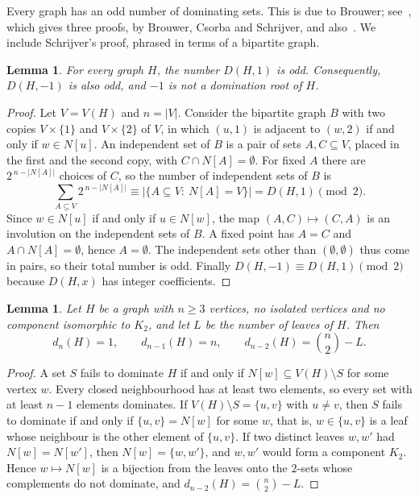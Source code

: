 \documentclass{amsart}
\newtheorem{lemma}[theorem]{Lemma}
\theoremstyle{definition}
\theoremstyle{remark}
\numberwithin{equation}{section}
\begin{document}
Every graph has an odd number of dominating sets. This is due to Brouwer; see~\cite{Bro09}, which gives three proofs, by Brouwer, Csorba and Schrijver, and also~\cite[Theorem~5]{Obo16}. We include Schrijver's proof, phrased in terms of a bipartite graph.

\begin{lemma}\label{lem:parity}
For every graph $H$, the number $D(H,1)$ is odd. Consequently, $D(H,-1)$ is also odd, and $-1$ is not a domination root of $H$.
\end{lemma}

\begin{proof}
Let $V=V(H)$ and $n=|V|$. Consider the bipartite graph $B$ with two copies $V\times\{1\}$ and $V\times\{2\}$ of $V$, in which $(u,1)$ is adjacent to $(w,2)$ if and only if $w\in N[u]$. An independent set of $B$ is a pair of sets $A,C\subseteq V$, placed in the first and the second copy, with $C\cap N[A]=\emptyset$. For fixed $A$ there are $2^{\,n-|N[A]|}$ choices of $C$, so the number of independent sets of $B$ is
\[
\sum_{A\subseteq V}2^{\,n-|N[A]|}\equiv\bigl|\{A\subseteq V:\ N[A]=V\}\bigr|=D(H,1)\pmod 2.
\]
Since $w\in N[u]$ if and only if $u\in N[w]$, the map $(A,C)\mapsto(C,A)$ is an involution on the independent sets of $B$. A fixed point has $A=C$ and $A\cap N[A]=\emptyset$, hence $A=\emptyset$. The independent sets other than $(\emptyset,\emptyset)$ thus come in pairs, so their total number is odd. Finally $D(H,-1)\equiv D(H,1)\pmod 2$ because $D(H,x)$ has integer coefficients.
\end{proof}

\begin{lemma}\label{lem:top}
Let $H$ be a graph with $n\ge 3$ vertices, no isolated vertices and no component isomorphic to $K_2$, and let $L$ be the number of leaves of $H$. Then
\[
d_n(H)=1,\qquad d_{n-1}(H)=n,\qquad d_{n-2}(H)=\binom n2-L.
\]
\end{lemma}

\begin{proof}
A set $S$ fails to dominate $H$ if and only if $N[w]\subseteq V(H)\setminus S$ for some vertex $w$. Every closed neighbourhood has at least two elements, so every set with at least $n-1$ elements dominates. If $V(H)\setminus S=\{u,v\}$ with $u\neq v$, then $S$ fails to dominate if and only if $\{u,v\}=N[w]$ for some $w$, that is, $w\in\{u,v\}$ is a leaf whose neighbour is the other element of $\{u,v\}$. If two distinct leaves $w,w'$ had $N[w]=N[w']$, then $N[w]=\{w,w'\}$, and $w,w'$ would form a component $K_2$. Hence $w\mapsto N[w]$ is a bijection from the leaves onto the $2$-sets whose complements do not dominate, and $d_{n-2}(H)=\binom n2-L$.
\end{proof}
\end{document}
